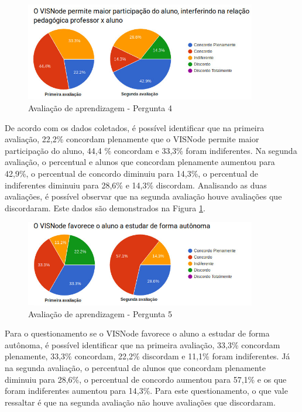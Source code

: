 \documentclass[
	12pt,				%
	oneside,			%
	a4paper,			%
	english,			%
	french,				%
	spanish,			%
	brazil,				%
	]{abntex2}
\begin{document}
\begin{figure}[H]
\centering
\caption{Avaliação de aprendizagem - Pergunta 4}\label{fig:avaliacaoAprendizagem4}
\includegraphics[width=0.9\textwidth]{imagens/avaliacoes/aprendizagem_4.jpg}
\sourceAuthor
\end{figure}

De acordo com os dados coletados, é possível identificar que na primeira avaliação, 22,2\% concordam plenamente que o VISNode permite maior participação do aluno, 44,4 \% concordam e 33,3\% foram indiferentes. Na segunda avaliação, o percentual e alunos que concordam plenamente aumentou para 42,9\%, o percentual de concordo diminuiu para 14,3\%, o percentual de indiferentes diminuiu para 28,6\% e 14,3\% discordam. Analisando as duas avaliações, é possível observar que na segunda avaliação houve avaliações que discordaram. Este dados são demonstrados na Figura \ref{fig:avaliacaoAprendizagem4}.

\begin{figure}[H]
\centering
\caption{Avaliação de aprendizagem - Pergunta 5}\label{fig:avaliacaoAprendizagem5}
\includegraphics[width=0.9\textwidth]{imagens/avaliacoes/aprendizagem_5.jpg}
\sourceAuthor
\end{figure}

Para o questionamento se o VISNode favorece o aluno a estudar de forma autônoma, é possível identificar que na primeira avaliação, 33,3\% concordam plenamente, 33,3\% concordam, 22,2\% discordam e 11,1\% foram indiferentes. Já na segunda avaliação, o percentual de alunos que concordam plenamente diminuiu para 28,6\%, o percentual de concordo aumentou para 57,1\% e os que foram indiferentes aumentou para 14,3\%. Para este questionamento, o que vale ressaltar é que na segunda avaliação não houve avaliações que discordaram.
\end{document}
